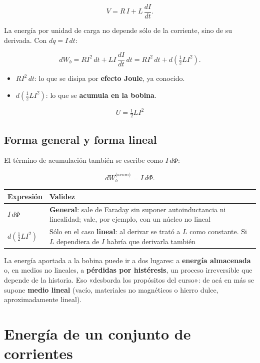 \documentclass[12pt,a4paper]{article}
\begin{document}
\[
V = R\,I + L\,\frac{dI}{dt}.
\]

La energía por unidad de carga no depende sólo de la corriente, sino de su
derivada. Con $dq = I\,dt$:

\[
dW_b = R I^2\,dt + L I\,\frac{dI}{dt}\,dt
= R I^2\,dt + d\!\left(\tfrac12 L I^2\right).
\]

\begin{itemize}
  \item $R I^2\,dt$: lo que se disipa por \textbf{efecto Joule}, ya conocido.
  \item $d(\tfrac12 L I^2)$: lo que se \textbf{acumula en la bobina}.
\end{itemize}

\begin{keybox}
\[
\boxed{\ U = \tfrac12 L I^2\ }
\]
\end{keybox}

\subsection{Forma general y forma lineal}

El término de acumulación también se escribe como $I\,d\Phi$:

\[
dW_b^{\text{(acum)}} = I\,d\Phi .
\]

\begin{center}
\renewcommand{\arraystretch}{1.35}
\small
\begin{tabularx}{\textwidth}{l>{\raggedright\arraybackslash}X}
\toprule
\textbf{Expresión} & \textbf{Validez} \\
\midrule
$I\,d\Phi$ & \textbf{General}: sale de Faraday sin suponer autoinductancia ni linealidad; vale, por ejemplo, con un núcleo no lineal \\
$d(\tfrac12 L I^2)$ & Sólo en el caso \textbf{lineal}: al derivar se trató a $L$ como constante. Si $L$ dependiera de $I$ habría que derivarla también \\
\bottomrule
\end{tabularx}
\end{center}

La energía aportada a la bobina puede ir a dos lugares: a \textbf{energía almacenada}
o, en medios no lineales, a \textbf{pérdidas por histéresis}, un proceso
irreversible que depende de la historia. Eso «desborda los propósitos del
curso»: de acá en más se supone \textbf{medio lineal} (vacío, materiales no
magnéticos o hierro dulce, aproximadamente lineal).

\section{Energía de un conjunto de corrientes}
\end{document}
